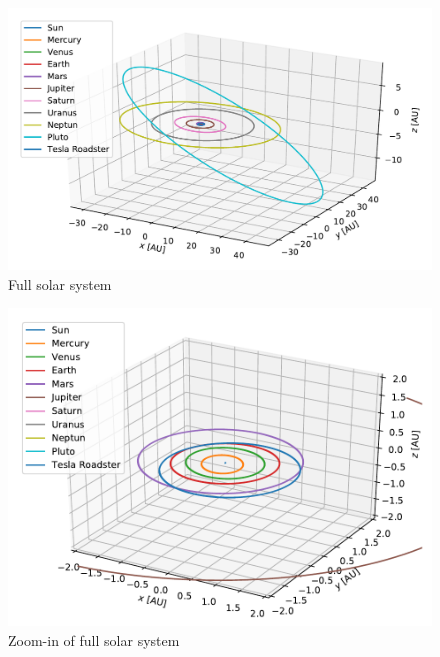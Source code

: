 \documentclass[twocolumn]{aastex62}
\begin{document}
\begin{figure}
\includegraphics[scale=1]{Figures/OuterSolarSystem.pdf}
\caption{Full solar system}
\label{fig:inner}
\end{figure}

\begin{figure}
\includegraphics[scale=1]{Figures/InnerSolarSystem.pdf}
\caption{Zoom-in of full solar system}
\label{fig:outer}
\end{figure}
\end{document}
